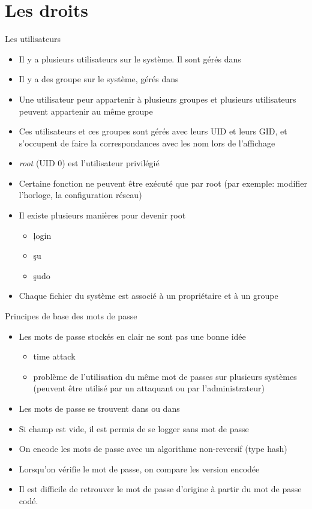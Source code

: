 \section{Les droits}

\begin{frame}[fragile=singleslide]{Les utilisateurs}
  \begin{itemize}
  \item Il  y a plusieurs utilisateurs  sur le système.  Il sont gérés
    dans 
  \item Il y a des groupe sur le système, gérés dans 
  \item  Une  utilisateur  peur  appartenir  à  plusieurs  groupes  et
    plusieurs utilisateurs peuvent appartenir au même groupe
  \item Ces utilisateurs  et ces groupes sont gérés avec  leurs UID et leurs
    GID,  et   s'occupent de faire
    la correspondances avec les nom lors de l'affichage
  \item \emph{root} (UID 0) est l'utilisateur privilégié
  \item Certaine  fonction ne peuvent  être exécuté que par  root (par
    exemple: modifier l'horloge, la configuration réseau)
  \item Il existe plusieurs manières pour devenir \c{root}
    \begin{itemize}
    \item \c{login}
    \item \c{su}
    \item \c{sudo}
    \end{itemize}
  \item Chaque fichier  du système est associé à  un propriétaire et à
    un groupe
  \end{itemize}
\end{frame}

\begin{frame}[fragile=singleslide]{Principes de base des mots de passe}
\begin{itemize}
\item Les mots de passe stockés en clair ne sont pas une bonne idée
  \begin{itemize}
  \item time attack
  \item problème de l'utilisation du  même mot de passes sur plusieurs
    systèmes   (peuvent être   utilisé   par  un   attaquant  ou   par
    l'administrateur)
  \end{itemize}
\item Les  mots de passe  se trouvent dans   ou dans
\item Si champ est vide, il est permis de se logger sans mot de passe
\item  On encode  les mots  de passe  avec un  algorithme non-reversif
  (type hash)
\item  Lorsqu'on vérifie  le  mot  de passe,  on  compare les  version
  encodée
\item Il est difficile de retrouver le mot de passe d'origine à partir
  du mot de passe codé.
\end{itemize}
\end{frame}

